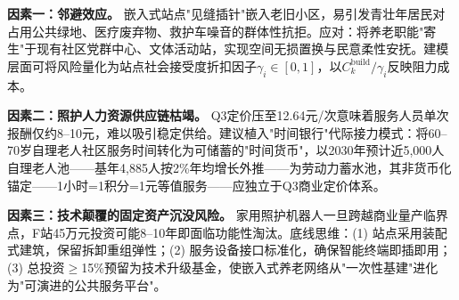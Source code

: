 \textbf{因素一：邻避效应。} 嵌入式站点"见缝插针"嵌入老旧小区，易引发青壮年居民对占用公共绿地、医疗废弃物、救护车噪音的群体性抗拒。应对：将养老职能"寄生"于现有社区党群中心、文体活动站，实现空间无损置换与民意柔性安抚。建模层面可将风险量化为站点社会接受度折扣因子$\gamma_i\in[0,1]$，以$C_k^{\text{build}}/\gamma_i$反映阻力成本。

\textbf{因素二：照护人力资源供应链枯竭。} Q3定价压至12.64元/次意味着服务人员单次报酬仅约8--10元，难以吸引稳定供给。建议植入"时间银行"代际接力模式：将60--70岁自理老人社区服务时间转化为可储蓄的"时间货币"，以2030年预计近5,000人自理老人池——基年4,885人按2\%年均增长外推——为劳动力蓄水池，其非货币化锚定——1小时=1积分=1元等值服务——应独立于Q3商业定价体系。

\textbf{因素三：技术颠覆的固定资产沉没风险。} 家用照护机器人一旦跨越商业量产临界点，F站45万元投资可能8--10年即面临功能性淘汰。底线思维：(1) 站点采用装配式建筑，保留拆卸重组弹性；(2) 服务设备接口标准化，确保智能终端即插即用；(3) 总投资$\ge$15\%预留为技术升级基金，使嵌入式养老网络从"一次性基建"进化为"可演进的公共服务平台"。
